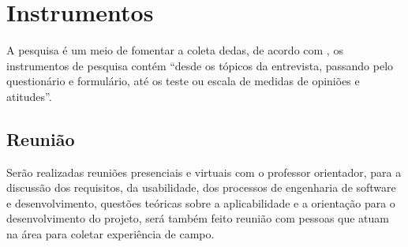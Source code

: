 \section{Instrumentos}






\par A pesquisa é um meio de fomentar a coleta dedas, de acordo com
, os instrumentos de pesquisa contém “desde os
tópicos da entrevista, passando pelo questionário e formulário, 
até os teste ou escala de medidas de opiniões e atitudes”.


\par 


\subsection{Reunião}

\par Serão realizadas reuniões presenciais e virtuais com o professor
orientador, para a discussão dos requisitos, da usabilidade, 
dos processos de engenharia de software e desenvolvimento, questões 
teóricas sobre a aplicabilidade e a orientação para o desenvolvimento do
projeto, será também feito reunião com pessoas que atuam na área para coletar
experiência de campo.

